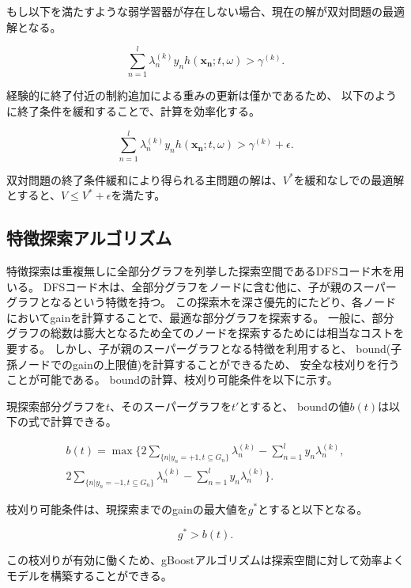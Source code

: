 もし以下を満たすような弱学習器が存在しない場合、現在の解が双対問題の最適解となる。

\begin{equation}
	\sum_{n=1}^{l} \lambda_{n}^{(k)} y_{n} h(\bm{x_{n}} ; t, \omega) > \gamma^{(k)}.
\end{equation}

経験的に終了付近の制約追加による重みの更新は僅かであるため、
以下のように終了条件を緩和することで、計算を効率化する。

\begin{equation}
	\sum_{n=1}^{l} \lambda_{n}^{(k)} y_{n} h(\bm{x_{n}} ; t, \omega) > \gamma^{(k)} + \epsilon .
\end{equation}

双対問題の終了条件緩和により得られる主問題の解は、$V^*$を緩和なしでの最適解とすると、$V \leq V^* + \epsilon$を満たす。


\subsection{特徴探索アルゴリズム}
特徴探索は重複無しに全部分グラフを列挙した探索空間であるDFSコード木\cite{gSpan}を用いる。
DFSコード木は、全部分グラフをノードに含む他に、子が親のスーパーグラフとなるという特徴を持つ。
この探索木を深さ優先的にたどり、各ノードにおいてgainを計算することで、最適な部分グラフを探索する。
一般に、部分グラフの総数は膨大となるため全てのノードを探索するためには相当なコストを要する。
しかし、子が親のスーパーグラフとなる特徴を利用すると、
bound(子孫ノードでのgainの上限値)を計算することができるため、
安全な枝刈りを行うことが可能である。
boundの計算、枝刈り可能条件を以下に示す。

現探索部分グラフを$t$、そのスーパーグラフを$t'$とすると、
boundの値$b(t)$は以下の式で計算できる。

\begin{eqnarray}
	b(t) = \max\{2 \sum_{\{n|y_{n}=+1, t \subseteq G_{n}\}} \lambda_{n}^{(k)} - \sum_{n=1}^{l} y_{n} \lambda_{n}^{(k)},\nonumber \\
	2 \sum_{\{n|y_{n}=-1, t \subseteq G_{n}\}} \lambda_{n}^{(k)} - \sum_{n=1}^{l} y_{n} \lambda_{n}^{(k)}\}.
\end{eqnarray}

枝刈り可能条件は、現探索までのgainの最大値を$g^{*}$とすると以下となる。

\begin{equation}
	g^{*} > b(t).
\end{equation}

この枝刈りが有効に働くため、gBoostアルゴリズムは探索空間に対して効率よくモデルを構築することができる。
